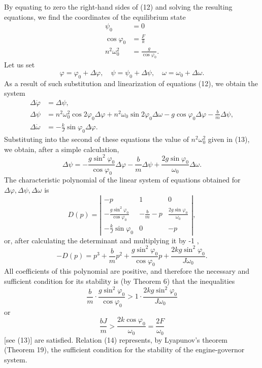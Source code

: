 \documentclass[10pt,a5paper]{book}
\theoremstyle{plain}
\theoremstyle{definition}
\theoremstyle{remark}
\begin{document}
By equating to zero the right-hand sides of (12) and solving the resulting equations, we find the coordinates of the equilibrium state
\begin{align*}
\psi_{0} & =0 \\
\cos \varphi_{0} & =\frac{F}{k}  \tag{13}\\
n^{2} \omega_{0}^{2} & =\frac{g}{\cos \varphi_{0}} .
\end{align*}
Let us set
\[
\varphi=\varphi_{0}+\Delta \varphi, \quad \psi=\psi_{0}+\Delta \psi, \quad \omega=\omega_{0}+\Delta \omega .
\]
As a result of such substitution and linearization of equations (12), we obtain the system
\[
\begin{aligned}
\Delta \dot{\varphi} & =\Delta \psi, \\
\Delta \psi & =n^{2} \omega_{0}^{2} \cos 2 \varphi_{0} \Delta \varphi+n^{2} \omega_{0} \sin 2 \varphi_{0} \Delta \omega-g \cos \varphi_{0} \Delta \varphi-\frac{b}{m} \Delta \psi, \\
\Delta \dot{\omega} & =-\frac{k}{J} \sin \varphi_{0} \Delta \varphi .
\end{aligned}
\]
Substituting into the second of these equations the value of $n^{2} \omega_{0}^{2}$ given in (13), we obtain, after a simple calculation,
\[
\Delta \psi=-\frac{g \sin ^{2} \varphi_{0}}{\cos \varphi_{0}} \Delta \varphi-\frac{b}{m} \Delta \psi+\frac{2 g \sin \varphi_{0}}{\omega_{0}} \Delta \omega .
\]
The characteristic polynomial of the linear system of equations obtained for $\Delta \varphi, \Delta \psi, \Delta \omega$ is
\[
D(p)=\left|\begin{array}{ccc}
-p & 1 & 0 \\
-\frac{g \sin ^{2} \varphi_{0}}{\cos \varphi_{0}} & -\frac{b}{m}-p & \frac{2 g \sin \varphi_{0}}{\omega_{0}} \\
-\frac{k}{J} \sin \varphi_{0} & 0 & -p
\end{array}\right|,
\]
or, after calculating the determinant and multiplying it by -1 ,
\[
-D(p)=p^{3}+\frac{b}{m} p^{2}+\frac{g \sin ^{2} \varphi_{0}}{\cos \varphi_{0}} p+\frac{2 k g \sin ^{2} \varphi_{0}}{J \omega_{0}} .
\]
All coefficients of this polynomial are positive, and therefore the necessary and sufficient condition for its stability is (by Theorem 6) that the inequalities
\[
\frac{b}{m} \cdot \frac{g \sin ^{2} \varphi_{0}}{\cos \varphi_{0}}>1 \cdot \frac{2 k g \sin ^{2} \varphi_{0}}{J \omega_{0}}
\]
or
\begin{equation*}
\frac{b J}{m}>\frac{2 k \cos \varphi_{0}}{\omega_{0}}=\frac{2 F}{\omega_{0}} \tag{14}
\end{equation*}
[see (13)] are satisfied. Relation (14) represents, by Lyapunov's theorem (Theorem 19), the sufficient condition for the stability of the engine-governor system.
\end{document}
